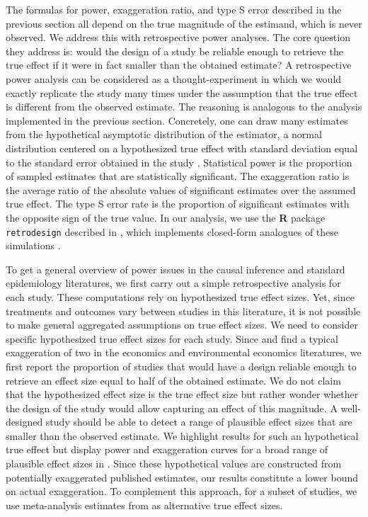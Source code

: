 \documentclass[12pt]{article}
\begin{document}
    		The formulas for power, exaggeration ratio, and type S error described in the previous section all depend on the true magnitude of the estimand, which is never observed. We address this with retrospective power analyses. The core question they address is: would the design of a study be reliable enough to retrieve the true effect if it were in fact smaller than the obtained estimate? A retrospective power analysis can be considered as a thought-experiment in which we would exactly replicate the study many times under the assumption that the true effect is different from the observed estimate. The reasoning is analogous to the analysis implemented in the previous section. Concretely, one can draw many estimates from the hypothetical asymptotic distribution of the estimator, a normal distribution centered on a hypothesized true effect with standard deviation equal to the standard error obtained in the study \citep{gelman_beyond_2014}. Statistical power is the proportion of sampled estimates that are statistically significant. The exaggeration ratio is the average ratio of the absolute values of significant estimates over the assumed true effect. The type S error rate is the proportion of significant estimates with the opposite sign of the true value. In our analysis, we use the \textbf{\textsf{R}} package \texttt{retrodesign} described in \cite{timm_retrodesign_2019}, which implements closed-form analogues of these simulations \citep{lu_note_2019}.
    
        		To get a general overview of power issues in the causal inference and standard epidemiology literatures, we first carry out a simple retrospective analysis for each study. These computations rely on hypothesized true effect sizes. Yet, since treatments and outcomes vary between studies in this literature, it is not possible to make general aggregated assumptions on true effect sizes. We need to consider specific hypothesized true effect sizes for each study. Since \cite{ioannidis_power_2017} and \cite{ferraro_feature_2020} find a typical exaggeration of two in the economics and environmental economics literatures, we first report the proportion of studies that would have a design reliable enough to retrieve an effect size equal to half of the obtained estimate. We do not claim that the hypothesized effect size is the true effect size but rather wonder whether the design of the study would allow capturing an effect of this magnitude. A well-designed study should be able to detect a range of plausible effect sizes that are smaller than the observed estimate. We highlight results for such an hypothetical true effect but display power and exaggeration curves for a broad range of plausible effect sizes in . Since these hypothetical values are constructed from potentially exaggerated published estimates, our results constitute a lower bound on actual exaggeration. To complement this approach, for a subset of studies, we use meta-analysis estimates from \cite{shah_short_2015} as alternative true effect sizes.
\end{document}
